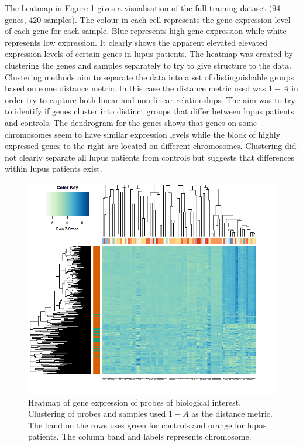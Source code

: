 \documentclass[a4paper, 12pt]{report}
\begin{document}
The heatmap in Figure \ref{F:heat} gives a visualisation of the full training dataset (94 genes, 420 samples).  The colour in each cell represents the gene expression level of each gene for each sample. Blue represents high gene expression while white represents low expression. It clearly shows the apparent elevated elevated expression levels of certain genes in lupus patients. The heatmap was created by clustering the genes and samples separately to try to give structure to the data. Clustering methods aim to separate the data into a set of distinguishable groups based on some distance metric. %
In this case the distance metric used was $1 - A$ in order try to capture both linear and non-linear relationships. The aim was to try to identify if genes cluster into distinct groups that differ between lupus patients and controls. The dendrogram for the genes shows that genes on some chromosomes seem to have similar expression levels while the block of highly expressed genes to the right are located on different chromosomes. Clustering did not clearly separate all lupus patients from controls but suggests that differences within lupus patients exist.

\begin{figure}[H]
\begin{center}
\includegraphics[width=\textwidth]{heat3.png}
\caption{Heatmap of gene expression of probes of biological interest. Clustering of probes and samples used $1-A$ as the distance metric. The band on the rows uses green for controls and orange for lupus patients. The column band and labels represents chromosome.} 
\label{F:heat}
\end{center}
\end{figure}
\end{document}

